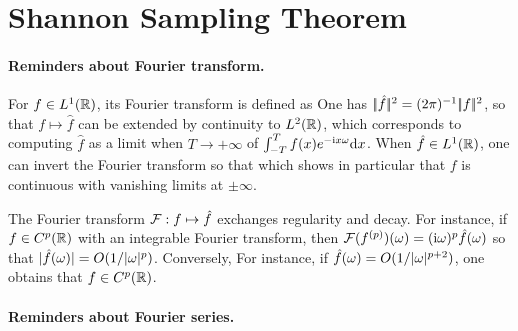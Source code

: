 \section{Shannon Sampling Theorem}
\label{subsec-sampling}

\paragraph{Reminders about Fourier transform.}

For $f \in L^1(\mathbb{R})$, its Fourier transform is defined as
One has $|\!| \hat f |\!|^2 = (2\pi)^{-1} |\!| f |\!|^2$, so that $f \mapsto \hat f$ can be extended by continuity to $L^2(\mathbb{R})$, which corresponds to computing $\hat f$ as a limit when $T \rightarrow +\infty$ of $\int_{-T}^T f(x) e^{-\mathrm{i} x \omega} \mathrm{d} x$.
%
When $\hat f \in L^1(\mathbb{R})$, one can invert the Fourier transform so that
which shows in particular that $f$ is continuous with vanishing limits at $\pm\infty$. 

The Fourier transform $\mathcal{F} : f \mapsto \hat f$ exchanges regularity and decay. For instance, if $f \in C^p(\mathbb{R})$ with an integrable Fourier transform, then $\mathcal{F}(f^{(p)})(\omega) = (\mathrm{i} \omega)^{p} \hat f(\omega)$ so that $|\hat f(\omega)|=O(1/|\omega|^p)$. 
%
Conversely, 
For instance, if $\hat f(\omega)=O(1/|\omega|^{p+2})$, one obtains that $f \in C^p(\mathbb{R})$. 

\paragraph{Reminders about Fourier series.}

